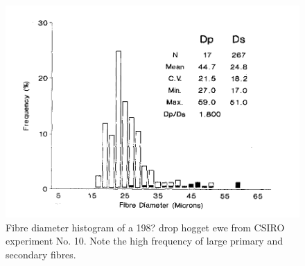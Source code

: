 %

\begin{figure}[h]
  \centering
  \includegraphics[width=\textwidth,trim = 0 0 0 20]{images/fig13ri.png}
  \caption{Fibre diameter histogram of a 198? drop hogget ewe from CSIRO
      experiment No. 10.  Note the high frequency of large primary and
      secondary fibres.}
  \label{fig:13}
\end{figure}

%
